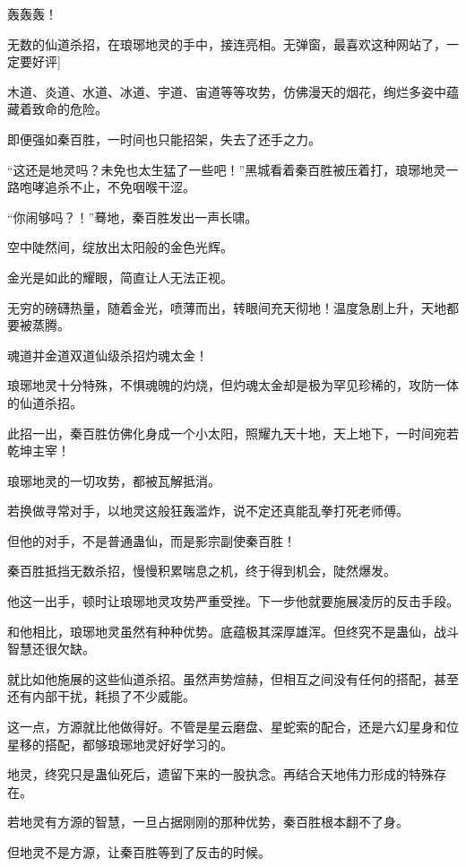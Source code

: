 
\begin{this_body}

轰轰轰！

无数的仙道杀招，在琅琊地灵的手中，接连亮相。无弹窗，最喜欢这种网站了，一定要好评]

木道、炎道、水道、冰道、宇道、宙道等等攻势，仿佛漫天的烟花，绚烂多姿中蕴藏着致命的危险。

即便强如秦百胜，一时间也只能招架，失去了还手之力。

“这还是地灵吗？未免也太生猛了一些吧！”黑城看着秦百胜被压着打，琅琊地灵一路咆哮追杀不止，不免咽喉干涩。

“你闹够吗？！”蓦地，秦百胜发出一声长啸。

空中陡然间，绽放出太阳般的金色光辉。

金光是如此的耀眼，简直让人无法正视。

无穷的磅礴热量，随着金光，喷薄而出，转眼间充天彻地！温度急剧上升，天地都要被蒸腾。

魂道并金道双道仙级杀招灼魂太金！

琅琊地灵十分特殊，不惧魂魄的灼烧，但灼魂太金却是极为罕见珍稀的，攻防一体的仙道杀招。

此招一出，秦百胜仿佛化身成一个小太阳，照耀九天十地，天上地下，一时间宛若乾坤主宰！

琅琊地灵的一切攻势，都被瓦解抵消。

若换做寻常对手，以地灵这般狂轰滥炸，说不定还真能乱拳打死老师傅。

但他的对手，不是普通蛊仙，而是影宗副使秦百胜！

秦百胜抵挡无数杀招，慢慢积累喘息之机，终于得到机会，陡然爆发。

他这一出手，顿时让琅琊地灵攻势严重受挫。下一步他就要施展凌厉的反击手段。

和他相比，琅琊地灵虽然有种种优势。底蕴极其深厚雄浑。但终究不是蛊仙，战斗智慧还很欠缺。

就比如他施展的这些仙道杀招。虽然声势煊赫，但相互之间没有任何的搭配，甚至还有内部干扰，耗损了不少威能。

这一点，方源就比他做得好。不管是星云磨盘、星蛇索的配合，还是六幻星身和位星移的搭配，都够琅琊地灵好好学习的。

地灵，终究只是蛊仙死后，遗留下来的一股执念。再结合天地伟力形成的特殊存在。

若地灵有方源的智慧，一旦占据刚刚的那种优势，秦百胜根本翻不了身。

但地灵不是方源，让秦百胜等到了反击的时候。


\end{this_body}
